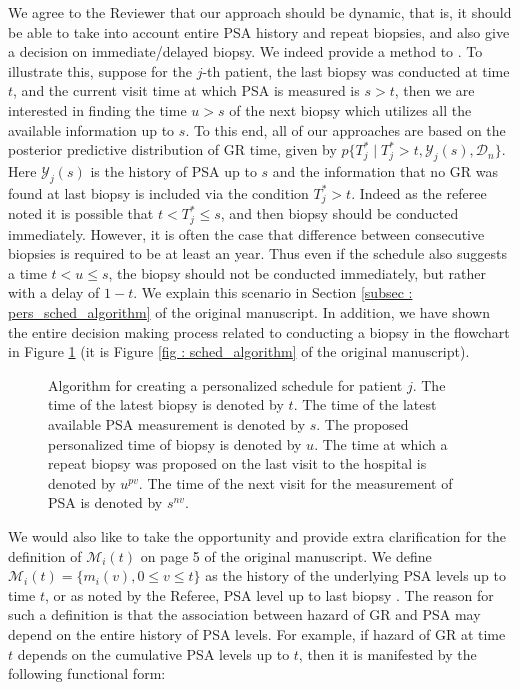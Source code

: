 \begin{enumerate}
    We agree to the Reviewer that our approach should be dynamic, that is, it should be able to take into account entire PSA history and repeat biopsies, and also give a decision on immediate/delayed biopsy. We indeed provide a method to . To illustrate this, suppose for the $j$-th patient, the last biopsy was conducted at time $t$, and the current visit time at which PSA is measured is $s > t$, then we are interested in finding the time $u > s$ of the next biopsy which utilizes all the available information up to $s$. To this end, all of our approaches are based on the posterior predictive distribution of GR time, given by $p\big\{T^*_j \mid T^*_j > t, \mathcal{Y}_j(s), \mathcal{D}_n\big\}$. Here $\mathcal{Y}_j(s)$ is the history of PSA up to $s$ and the information that no GR was found at last biopsy is included via the condition $T^*_j > t$. Indeed as the referee noted it is possible that $t <T^*_j \leq s$, and then biopsy should be conducted immediately. However, it is often the case that difference between consecutive biopsies is required to be at least an year. Thus even if the schedule also suggests a time $t < u \leq s$, the biopsy should not be conducted immediately, but rather with a delay of $1 - t$. We explain this scenario in Section \ref{subsec : pers_sched_algorithm} of the original manuscript. In addition, we have shown the entire decision making process related to conducting a biopsy in the flowchart in Figure \ref{fig : sched_algorithm_ref2} (it is Figure \ref{fig : sched_algorithm} of the original manuscript).

    \begin{figure}
\centerline{}
\caption{Algorithm for creating a personalized schedule for patient $j$. The time of the latest biopsy is denoted by $t$. The time of the latest available PSA measurement is denoted by $s$. The proposed personalized time of biopsy is denoted by $u$.  The time at which a repeat biopsy was proposed on the last visit to the hospital is denoted by $u^{pv}$. The time of the next visit for the measurement of PSA is denoted by $s^{nv}$.} 
\label{fig : sched_algorithm_ref2}
\end{figure}

    We would also like to take the opportunity and provide extra clarification for the definition of $\mathcal{M}_i(t)$ on page 5 of the original manuscript. We define $\mathcal{M}_i(t) = \{m_i(v), 0\leq v \leq t\}$ as the history of the underlying PSA levels up to time $t$, or as noted by the Referee, PSA level up to last biopsy \citep{tsiatis2004joint,rizopoulos2012joint}. The reason for such a definition is that the association between hazard of GR and PSA may depend on the entire history of PSA levels. For example, if hazard of GR at time $t$ depends on the cumulative PSA levels up to $t$, then it is manifested by the following functional form:
    

\end{enumerate}
